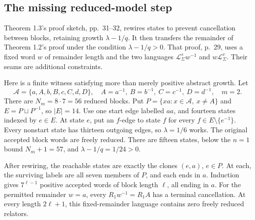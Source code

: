 \documentclass[10pt]{article}
\begin{document}
\subsection*{The missing reduced-model step}
Theorem 1.3’s proof sketch, pp. 31–32, rewires states to prevent cancellation between blocks, retaining growth \(\lambda-1/q\). It then transfers the remainder of Theorem 1.2’s proof under the condition \(\lambda-1/q>0\). That proof, p. 29, uses a fixed word \(w\) of remainder length and the two languages \(\mathcal L_\Sigma^{s}w^{-1}\) and \(w\mathcal L_\Sigma^v\). Their seams are additional constraints.\par
Here is a finite witness satisfying more than merely positive abstract growth. Let \[\mathcal A=\{a,A,b,B,c,C,d,D\},\quad
 A=a^{-1},\ B=b^{-1},\ C=c^{-1},\ D=d^{-1},
 \quad m=2.\] There are \(N_m=8\cdot7=56\) reduced blocks. Put \(P=\{xa:x\in\mathcal A,\ x\ne A\}\) and \(E=P\sqcup P^{-1}\), so \(|E|=14\). Use one start edge labelled \(aa\), and fourteen states indexed by \(e\in E\). At state \(e\), put an \(f\)-edge to state \(f\) for every \(f\in E\setminus\{e^{-1}\}\). Every nonstart state has thirteen outgoing edges, so \(\lambda=1/6\) works. The original accepted block words are freely reduced. There are fifteen states, below the \(n=1\) bound \(N_m+1=57\), and \(\lambda-1/q=1/24>0\).\par
After rewiring, the reachable states are exactly the clones \((e,a)\), \(e\in P\). At each, the surviving labels are all seven members of \(P\), and each ends in \(a\). Induction gives \(7^{\ell-1}\) positive accepted words of block length \(\ell\), all ending in \(a\). For the permitted remainder \(w=a\), every \(R_1w^{-1}=R_1A\) has a terminal cancellation. At every length \(2\ell+1\), this fixed-remainder language contains zero freely reduced relators.\par
\end{document}
